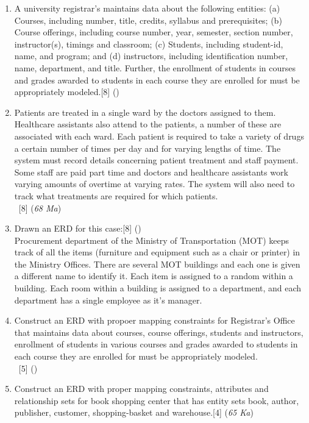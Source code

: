 \documentclass[12pt]{article}
\newcommand{\enter}{\\\textcolor{white}{1}}
\begin{document}
\begin{enumerate}
    \item A university registrar's maintains data about the following entities: (a) Courses, including number, title, credits, syllabus and prerequisites; (b) Course offerings, including course number, year, semester, section number, instructor(s), timings and classroom; (c) Students, including student-id, name, and program; and (d) instructors, including identification number, name, department, and title. Further, the enrollment of students in courses and grades awarded to students in each course they are enrolled for must be appropriately modeled.\hfill[8] ()

    \item Patients are treated in a single ward by the doctors assigned to them. Healthcare assistants also attend to the patients, a number of these are associated with each ward. Each patient is required to take a variety of drugs a certain number of times per day and for varying lengths of time. The system must record details concerning patient treatment and staff payment. Some staff are paid part time and doctors and healthcare assistants work varying amounts of overtime at varying rates. The system will also need to track what treatments are required for which patients.
    \enter\hfill[8] (\textit{68 Ma})

    \item Drawn an ERD for this case:\hfill[8] ()\\
    Procurement department of the Ministry of Transportation (MOT) keeps track of all the items (furniture and equipment such as a chair or printer) in the Ministry Offices. There are several MOT buildings and each one is given a different name to identify it. Each item is assigned to a random within a building. Each room within a building is assigned to a department, and each department has a single employee as it's manager.

    \item Construct an ERD with propoer mapping constraints for Registrar's Office that maintains data about courses, course offerings, students and instructors, enrollment of students in various courses and grades awarded to students in each course they are enrolled for must be appropriately modeled.
    \enter\hfill[5] ()

    \item Construct an ERD with proper mapping constraints, attributes and relationship sets for book shopping center that has entity sets book, author, publisher, customer, shopping-basket and warehouse.\hspace{14.4cm}[4] (\textit{65 Ka})
    \end{enumerate}
\end{document}
